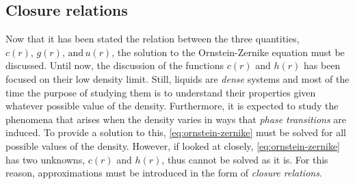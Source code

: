\subsection{Closure relations}
Now that it has been stated the relation between the three quantities, 
$c(r), \, g(r), \, \text{and} \, u(r)$, the solution to the Ornstein-Zernike equation
must be discussed. Until now, the discussion of the functions $c(r)$ and $h(r)$ has been
focused on their low density limit. Still, liquids are \emph{dense} systems and most of
the time the purpose of studying them is to understand their properties given whatever
possible value of the density. Furthermore, it is expected to study the phenomena that
arises when the density varies in ways that \emph{phase transitions} are induced.
To provide a solution to this, \autoref{eq:ornstein-zernike} must be solved for all possible
values of the density. However, if looked at closely, \autoref{eq:ornstein-zernike} has
two unknowns, $c(r)$ and $h(r)$, thus cannot be solved as it is. For this reason,
approximations must be introduced in the form of \emph{closure relations}.

